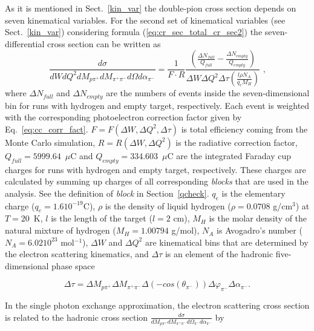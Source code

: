 As it is mentioned in Sect.~\ref{kin_var} the double-pion cross section depends on seven kinematical variables. 
For the second set of kinematical
variables (see Sect.~\ref{kin_var}) considering formula (\ref{eq:cr_sec_total_cr_sec2}) the seven-differential cross section can be
written as 
\begin{equation}
\frac{d\sigma}{dWdQ^{2}dM_{p\pi^{+}}dM_{\pi^{+}\pi^{-}}d\Omega
d\alpha_{\pi^{-}}} = \frac{1}{F \cdot R} 
\frac{\left( \frac{\Delta N_{full}}{Q_{full}}-\frac{\Delta N_{empty}}{Q_{empty}} \right)}{
\Delta W \Delta Q^{2} \Delta \tau \left( \frac{l \rho N_{A}}{q_{e}M_{H}} \right)} \textrm{ ,}
\label{expcrossect}
\end{equation}
where $\Delta N_{full}$ and $\Delta N_{empty}$ are the numbers of events inside the
seven-dimensional bin for runs with hydrogen and
empty target, respectively. Each event is weighted with the corresponding photoelectron correction factor given by Eq.~\ref{eq:cc_corr_fact}. $F = F(\Delta W, \Delta Q^{2}, \Delta \tau)$ is total efficiency
 coming from the  Monte Carlo simulation,
$R = R(\Delta W, \Delta Q^{2})$ is the
radiative correction factor,  $Q_{full}= 5999.64$~$\mu$C and $Q_{empty} = 334.603$~$\mu$C are the integrated Faraday cup charges for runs with hydrogen and empty target, respectively. These charges are calculated by summing up charges of all corresponding {\em blocks} that are used in the analysis. See the definition of {\em block} in Section~\ref{qcheck}. $q_{e}$ is the elementary charge ($q_{e} =1.610^{-19} $C), $\rho$ is the density of liquid hydrogen ($\rho = 0.0708 $ g/cm$^{3}$) at $T = 20$~K,
$l$ is the length of the target ($l = 2$ cm), $M_{H}$ is the molar density of
the natural mixture of hydrogen ($M_{H} = 1.00794$ g/mol),  $N_{A}$ is Avogadro's
number ($N_{A} =6.0210^{23}$ mol$^{-1}$),  $\Delta
W$ and $ \Delta Q^{2}$ are kinematical bins that are determined by the electron
scattering
 kinematics, and $\Delta \tau$ is an element of the
 hadronic five-dimensional phase space

\begin{equation}
\Delta \tau = \Delta M_{p\pi^{+}} \Delta
M_{\pi^{+}\pi^{-}} \Delta
(-cos(\theta_{\pi^{-}})) \Delta
\varphi_{\pi^{-}} \Delta \alpha_{\pi^{-}}.
\label{multibin}
\end{equation}


In the single photon exchange approximation,
the electron scattering cross section is related
to the hadronic cross section $\frac{d\sigma}{dM_{p\pi^{+}}dM_{\pi^{+}\pi^{-}}d\Omega_{\pi^{-}}
d\alpha_{\pi^{-}}}$ by

